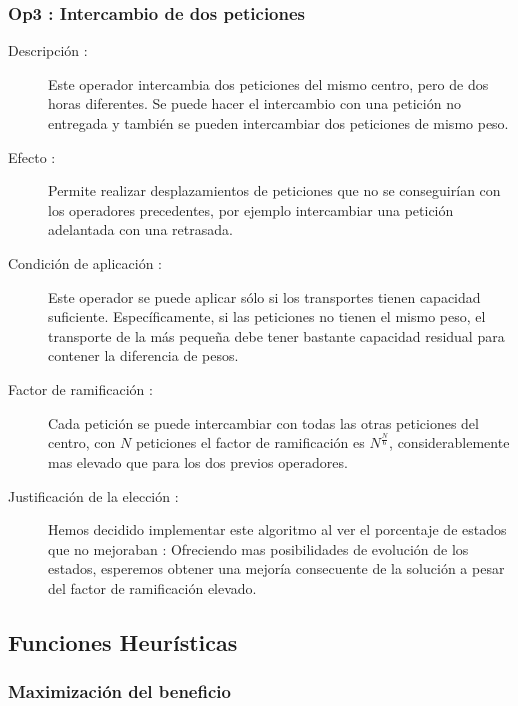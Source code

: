 \documentclass{article}
\begin{document}
\subsubsection{Op3 : Intercambio de dos peticiones}

\begin{description}
\item[Descripción :] Este operador intercambia dos peticiones del mismo centro,
pero de dos horas diferentes. Se puede hacer el intercambio con una petición no
entregada y también se pueden intercambiar dos peticiones de mismo peso.
\item[Efecto :] Permite realizar desplazamientos de peticiones que no se
conseguirían con los operadores precedentes, por ejemplo intercambiar una
petición adelantada con una retrasada. 
\item[Condición de aplicación :] Este operador se puede aplicar sólo si los
transportes tienen capacidad suficiente. Específicamente, si las peticiones no
tienen el mismo peso, el transporte de la más pequeña debe tener bastante
capacidad residual para contener la diferencia de pesos.
\item[Factor de ramificación :] Cada petición se puede intercambiar con todas
las otras peticiones del centro, con $N$ peticiones el factor de ramificación es
$N^{\frac{N}{6}}$, considerablemente mas elevado que para los dos previos
operadores.
\item[Justificación de la elección :] Hemos decidido implementar este algoritmo
al ver el porcentaje de estados que no mejoraban : Ofreciendo mas posibilidades
de evolución de los estados, esperemos obtener una mejoría consecuente de la
solución a pesar del factor de ramificación elevado.
\end{description}

\subsection{Funciones Heurísticas}

\subsubsection{Maximización del beneficio}
\end{document}
